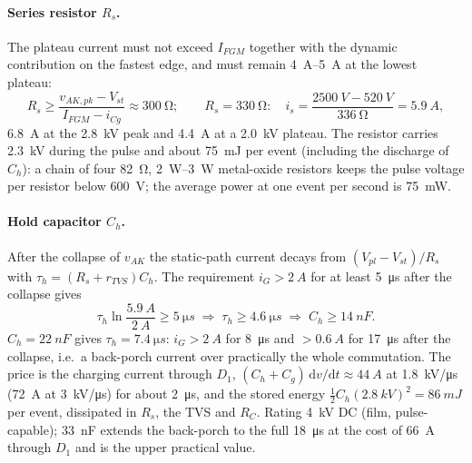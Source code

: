 \documentclass[11pt,a4paper]{article}
\begin{document}
\paragraph{Series resistor $R_s$.} The plateau current must not exceed $I_{FGM}$ together with the
dynamic contribution on the fastest edge, and must remain \SIrange{4}{5}{A} at the lowest
plateau:
\begin{equation}
  R_s \ge \frac{v_{AK,pk} - V_{st}}{I_{FGM} - i_{Cg}} \approx \SI{300}{\ohm};\qquad
  R_s = \SI{330}{\ohm}:\quad
  i_s = \frac{\SI{2500}{V} - \SI{520}{V}}{\SI{336}{\ohm}} = \SI{5.9}{A},
\end{equation}
\SI{6.8}{A} at the \SI{2.8}{kV} peak and \SI{4.4}{A} at a \SI{2.0}{kV} plateau.
The resistor carries \SI{2.3}{kV} during the pulse and about \SI{75}{mJ} per event (including
the discharge of $C_h$): a chain of four \SI{82}{\ohm}, \SIrange{2}{3}{W} metal-oxide
resistors keeps the pulse voltage per resistor below \SI{600}{V}; the average power at one event
per second is \SI{75}{mW}.

\paragraph{Hold capacitor $C_h$.} After the collapse of $v_{AK}$ the static-path current decays
from $(V_{pl} - V_{st})/R_s$ with $\tau_h = (R_s + r_{TVS}) C_h$. The requirement
$i_G > \SI{2}{A}$ for at least \SI{5}{\micro s} after the collapse gives
\begin{equation}
  \tau_h \ln\frac{\SI{5.9}{A}}{\SI{2}{A}} \ge \SI{5}{\micro s}
  \;\Rightarrow\; \tau_h \ge \SI{4.6}{\micro s}
  \;\Rightarrow\; C_h \ge \SI{14}{nF}.
\end{equation}
$C_h = \SI{22}{nF}$ gives $\tau_h = \SI{7.4}{\micro s}$: $i_G > \SI{2}{A}$ for \SI{8}{\micro s}
and $> \SI{0.6}{A}$ for \SI{17}{\micro s} after the collapse, i.e.\ a back-porch current over
practically the whole commutation. The price is the charging current through $D_1$,
$(C_h + C_g)\,\mathrm{d}v/\mathrm{d}t \approx \SI{44}{A}$ at \SI{1.8}{kV/\micro s}
(\SI{72}{A} at \SI{3}{kV/\micro s}) for about \SI{2}{\micro s}, and the stored energy
$\tfrac12 C_h (\SI{2.8}{kV})^2 = \SI{86}{mJ}$ per event, dissipated in $R_s$, the TVS and $R_C$.
Rating \SI{4}{kV} DC (film, pulse-capable); \SI{33}{nF} extends the back-porch to the full
\SI{18}{\micro s} at the cost of \SI{66}{A} through $D_1$ and is the upper practical value.
\end{document}
